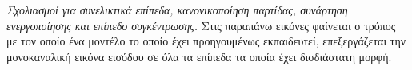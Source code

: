 \textit{Σχολιασμοί για συνελικτικά επίπεδα, κανονικοποίηση παρτίδας, συνάρτηση ενεργοποίησης και επίπεδο συγκέντρωσης.}
Στις παραπάνω εικόνες φαίνεται ο τρόπος με τον οποίο ένα μοντέλο το οποίο έχει προηγουμένως εκπαιδευτεί, επεξεργάζεται την μονοκαναλική εικόνα εισόδου σε όλα τα επίπεδα τα οποία έχει δισδιάστατη μορφή. 